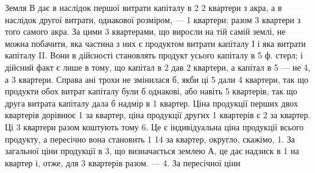 
Земля $В$ дає в наслідок першої витрати капіталу в 2 2 квартери
з акра, а в наслідок другої витрати, однакової розміром, — 1 квартери; разом
3 квартери з того самого акра. За цими 3 квартерами, що виросли
на тій самій землі, не можна побачити, яка частина з них є продуктом витрати
капіталу І і яка витрати капіталу II. Вони в дійсності становлять продукт
усього капіталу в 5 ф. стерл; і дійсний факт є лише в тому, що капітал
в 2 дав 2 квартери, а капітал в 5 — не 4, а 3 квартери.
Справа ані трохи не змінилася б, якби ці 5 дали 4 квартери, так що
продукти обох витрат капіталу були б однакові, або навіть 5 квартерів, так
що друга витрата капіталу дала б надмір в 1 квартер. Ціна продукції перших
двох квартерів дорівнює 1 за квартер, ціна продукції других 1 квартерів є 2 за квартер. Ці 3 квартери разом коштують тому 6.
Це є індивідуальна ціна продукції всього продукту, а пересічно вона становить
1 14 за квартер, округло, скажімо, 1. За загальної ціни
продукції в 3, що визначається землею $А$, це дає надзиск в 1
на квартер і, отже, для 3 квартерів разом. — 4. За пересічної ціни
\parbreak{}  %
